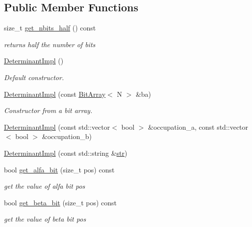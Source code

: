 \subsection*{Public Member Functions}
\begin{DoxyCompactItemize}
\item 
size\+\_\+t \mbox{\hyperlink{classforte_1_1_determinant_impl_afc9e7b4d9b3ec24a97ca3793272ce595}{get\+\_\+nbits\+\_\+half}} () const
\begin{DoxyCompactList}\small\item\em returns half the number of bits \end{DoxyCompactList}\item 
\mbox{\hyperlink{classforte_1_1_determinant_impl_a7c8dfa806c2a2991024ae0fd2c041616}{Determinant\+Impl}} ()
\begin{DoxyCompactList}\small\item\em Default constructor. \end{DoxyCompactList}\item 
\mbox{\hyperlink{classforte_1_1_determinant_impl_a007afc997d612ea68ef4760d56617bf5}{Determinant\+Impl}} (const \mbox{\hyperlink{classforte_1_1_bit_array}{Bit\+Array}}$<$ N $>$ \&ba)
\begin{DoxyCompactList}\small\item\em Constructor from a bit array. \end{DoxyCompactList}\item 
\mbox{\hyperlink{classforte_1_1_determinant_impl_a45a02db5e268e7e2c2978bd105f571b3}{Determinant\+Impl}} (const std\+::vector$<$ bool $>$ \&occupation\+\_\+a, const std\+::vector$<$ bool $>$ \&occupation\+\_\+b)
\item 
\mbox{\hyperlink{classforte_1_1_determinant_impl_a85f7530da66f7fb1a649be1ad69b0e94}{Determinant\+Impl}} (const std\+::string \&\mbox{\hyperlink{namespaceforte_af0f9481a38ad3ccb1dd258bdfea20492}{str}})
\item 
bool \mbox{\hyperlink{classforte_1_1_determinant_impl_a14a47fa6165d685967ce1c8554c7d3cc}{get\+\_\+alfa\+\_\+bit}} (size\+\_\+t pos) const
\begin{DoxyCompactList}\small\item\em get the value of alfa bit pos \end{DoxyCompactList}\item 
bool \mbox{\hyperlink{classforte_1_1_determinant_impl_a7105d98744e76588e9db2797e12c8406}{get\+\_\+beta\+\_\+bit}} (size\+\_\+t pos) const
\begin{DoxyCompactList}\small\item\em get the value of beta bit pos \end{DoxyCompactList}\item 

\end{DoxyCompactItemize}
